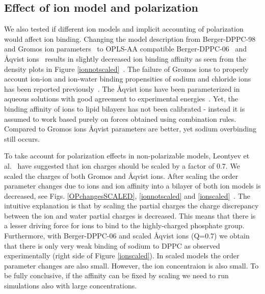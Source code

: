 \documentclass[pre,aps,floatfix,authordate1-4,twocolumn]{revtex4-1}
\begin{document}
\subsection{Effect of ion model and polarization}

 We also tested if different ion models and implicit accounting of polarization would affect ion binding.
 Changing the model description from Berger-DPPC-98~\cite{Marrink98} and Gromos ion
 parameters~\cite{??} to OPLS-AA compatible
 Berger-DPPC-06~\cite{tieleman06} and \r{A}qvist ions~\cite{Aaqvist90} results in slightly decreased ion binding affinity
 as seen from the density plots in Figure \ref{ionnotscaled}~\cite{DPPCBergerNaCl, DPPCBergerOPLS06NaCl}. The failure
 of Gromos ions to properly account ion-ion and ion-water binding propensities of sodium and chloride ions has been
 reported previously~\cite{Reif13}. The \r{A}qvist ions have been parameterized in aqueous solutions with good agreement
 to experimental energies~\cite{Aaqvist90}. Yet, the binding affinity of ions to lipid bilayers has not been
 calibrated - instead it is assumed to work based purely on forces obtained using combination rules. Compared to Gromos
 ions \r{A}qvist parameters are better, yet sodium overbinding still occurs.

To take account for polarization effects in non-polarizable models, Leontyev et al.~\cite{leontyev11} have suggested
that ion charges should be scaled by a factor of 0.7. We scaled the charges of both Gromos and \r{A}qvist ions. 
After scaling the order parameter changes due to ions and ion affinity into a bilayer of both ion models is decreased, see
Figs. \ref{OPchangesSCALED}, \ref{ionnotscaled} and \ref{ionscaled}~\cite{DPPCBergerNaClscaled, DPPCBergerOPLS06NaClscaled}. The intuitive explanation is that by
scaling the partial charges the charge discrepancy between the ion and water partial charges is decreased. This means
that there is a lesser driving force for ions to bind to the highly-charged phosphate group. Furthermore, with
Berger-DPPC-06 and scaled Åqvist ions (Q=0.7) we obtain that there is only very weak binding of sodium to DPPC as
observed experimentally (right side of Figure \ref{ionscaled}). In scaled models the order parameter changes 
are also small. However, the ion concentraion is also small. To be fully conclusive, if the affinity can be fixed by scaling
we need to run simulations also with large concentrations.
\end{document}
